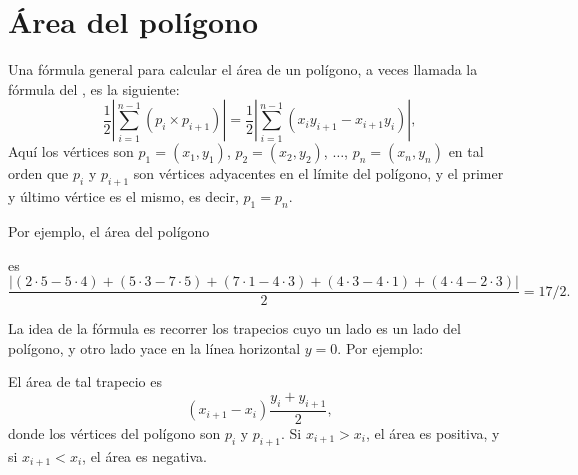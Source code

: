 \section{Área del polígono}

Una fórmula general para calcular el área
de un polígono, a veces llamada la fórmula del ,
es la siguiente: 
\[\frac{1}{2} |\sum_{i=1}^{n-1} (p_i \times p_{i+1})| =
\frac{1}{2} |\sum_{i=1}^{n-1} (x_i y_{i+1} - x_{i+1} y_i)|, \]
Aquí los vértices son
$p_1=(x_1,y_1)$, $p_2=(x_2,y_2)$, $\ldots$, $p_n=(x_n,y_n)$
en tal orden que
$p_i$ y $p_{i+1}$ son vértices adyacentes en el límite
del polígono,
y el primer y último vértice es el mismo, es decir, $p_1=p_n$.

Por ejemplo, el área del polígono
\begin{center}
\end{center}
es
\[\frac{|(2\cdot5-5\cdot4)+(5\cdot3-7\cdot5)+(7\cdot1-4\cdot3)+(4\cdot3-4\cdot1)+(4\cdot4-2\cdot3)|}{2} = 17/2.\]

La idea de la fórmula es recorrer los trapecios
cuyo un lado es un lado del polígono,
y otro lado yace en la línea horizontal $y=0$.
Por ejemplo:
\begin{center}
\end{center}
El área de tal trapecio es
\[(x_{i+1}-x_{i}) \frac{y_i+y_{i+1}}{2},\]
donde los vértices del polígono son $p_i$ y $p_{i+1}$.
Si $x_{i+1}>x_{i}$, el área es positiva,
y si $x_{i+1}<x_{i}$, el área es negativa.

